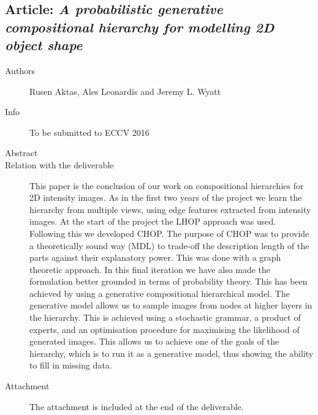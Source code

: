 \documentclass[a4paper,11pt,pdf]{pacmanreport}
\begin{document}
\subsection{Article: \em A probabilistic generative compositional hierarchy for modelling 2D object shape}
\begin{description}
    \item[Authors] Rusen Aktas, Ales Leonardis and Jeremy L. Wyatt
    \item[Info] To be submitted to ECCV 2016 %
    \item[Abstract] 
    \item [Relation with the deliverable] This paper is the conclusion of our work on compositional hierarchies for 2D intensity images. As in the first two years of the project we learn the hierarchy from multiple views, using edge features extracted from intensity images. At the start of the project the LHOP approach was used. Following this we developed CHOP. The purpose of CHOP was to provide a theoretically sound way (MDL) to trade-off the description length of the parts against their explanatory power. This was done with a graph theoretic approach. In this final iteration we have also made the formulation better grounded in terms of probability theory. This has been achieved by using a generative compositional hierarchical model. The generative model allows us to sample images from nodes at higher layers in the hierarchy. This is achieved using a stochastic grammar, a product of experts, and an optimisation procedure for maximising the likelihood of generated images. This allows us to achieve one of the goals of the hierarchy, which is to run it as a generative model, thus showing the ability to fill in missing data.
    
    \item[Attachment] The attachment is included at the end of the deliverable. %
\end{description}
\newpage
\end{document}
